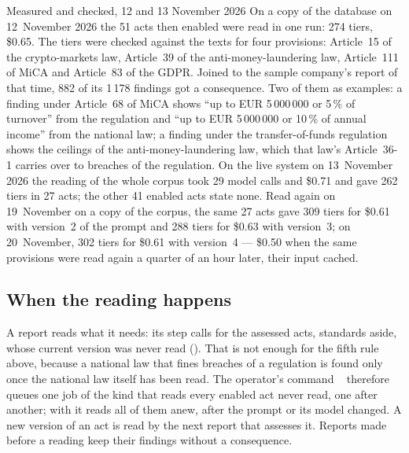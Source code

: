 \begin{lessonbox}{Measured and checked, 12 and 13 November 2026}
On a copy of the database on 12~November 2026 the 51 acts then enabled were read in one run:
274 tiers, \$0.65. The tiers were checked against the texts for four provisions: Article~15
of the crypto-markets law, Article~39 of the anti-money-laundering law, Article~111 of MiCA
and Article~83 of the GDPR. Joined to the sample company's report of that time, 882 of its
1\,178 findings got a consequence. Two of them as examples: a finding under Article~68 of
MiCA shows \enquote{up to EUR 5\,000\,000 or 5\,\% of turnover} from the regulation and
\enquote{up to EUR 5\,000\,000 or 10\,\% of annual income} from the national law; a finding
under the transfer-of-funds regulation shows the ceilings of the anti-money-laundering law,
which that law's Article~36-1 carries over to breaches of the regulation. On the live system
on 13~November 2026 the reading of the whole corpus took 29 model calls and \$0.71 and gave
262 tiers in 27 acts; the other 41 enabled acts state none. Read again on 19~November on a
copy of the corpus, the same 27 acts gave 309 tiers for \$0.61 with version~2 of the prompt
and 288 tiers for \$0.63 with version~3; on 20~November, 302 tiers for \$0.61 with
version~4 --- \$0.50 when the same provisions were read again a quarter of an hour later,
their input cached.
\end{lessonbox}

\subsection{When the reading happens}

A report reads what it needs: its step  calls  for
the assessed acts, standards aside, whose current version was never read
(). That is not enough for the fifth rule above, because a national
law that fines breaches of a regulation is found only once the national law itself has been
read. The operator's command ~ therefore queues one job of the
kind  that reads every enabled act never read, one after
another; with  it reads all of them anew, after the prompt or its model
changed. A new version of an act is read by the next report that assesses it. Reports made
before a reading keep their findings without a consequence.

